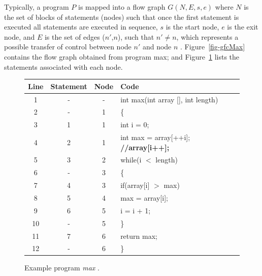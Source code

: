 Typically, a program $ P $ is mapped into a flow graph  $G(N,E, s, e)$
where $N$ is the set of blocks of statements (nodes) such that once
the first statement is executed all statements are executed in
sequence, $s$ is the start node, $e$ is the exit node, and $E$ is
the set of edges ($n'$,$n$), such that $n' \neq n$, which represents a possible transfer of
control between node $n'$ and node $n$ \cite{chaim2013}. Figure~\ref{fig-gfcMax} contains the flow
graph obtained from program max; and Figure~\ref{fig-max} lists the statements associated with each node.

\begin{figure}[h!]
\centering
\begin{tabular}{|c|c|c|l|}
  \hline Line & Statement & Node & Code \\
  \hline
  1 & - & - & int max(int array [], int length) \\
  2 & - & 1 & \{ \\
  3 & 1 & 1 & \hspace{0.2 cm} int i = 0; \\
  4 & 2 & 1 & \hspace{0.2 cm} int max = array[++i]; \textbf{//array[i++];} \\
  5 & 3 & 2 & \hspace{0.2 cm} while(i $<$ length) \\
  6 & - & 3 & \hspace{0.2 cm} \{ \\
  7 & 4 & 3 & \hspace{0.6 cm} if(array[i] $>$ max) \\
  8 & 5 & 4 & \hspace{1.0 cm} max = array[i]; \\
  9 & 6 & 5 & \hspace{0.6 cm} i = i + 1; \\
  10 & - & 5 & \hspace{0.2 cm} \} \\
  11 & 7 & 6 & \hspace{0.2 cm} return max; \\
  12 & - & 6 & \} \\
  \hline
\end{tabular}
\caption{Example program \textit{max} \cite{chaim2013}.\label{fig-max}}
\end{figure}

